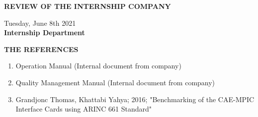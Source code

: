 \documentclass[a4paper,13pt]{report}
\begin{document}
    \newpage
    \centerline{\huge{\textbf{REVIEW OF THE INTERNSHIP COMPANY}}}
    \vspace{10mm}
    \noindent\makebox[\linewidth]{\rule{\paperwidth}{0.4pt}}
    \noindent\makebox[\linewidth]{\rule{\paperwidth}{0.4pt}}
    \noindent\makebox[\linewidth]{\rule{\paperwidth}{0.4pt}}
    \noindent\makebox[\linewidth]{\rule{\paperwidth}{0.4pt}}
    \noindent\makebox[\linewidth]{\rule{\paperwidth}{0.4pt}}
    \noindent\makebox[\linewidth]{\rule{\paperwidth}{0.4pt}}
    \noindent\makebox[\linewidth]{\rule{\paperwidth}{0.4pt}}
    \noindent\makebox[\linewidth]{\rule{\paperwidth}{0.4pt}}
    \noindent\makebox[\linewidth]{\rule{\paperwidth}{0.4pt}}
    \noindent\makebox[\linewidth]{\rule{\paperwidth}{0.4pt}}
    \noindent\makebox[\linewidth]{\rule{\paperwidth}{0.4pt}}
    \noindent\makebox[\linewidth]{\rule{\paperwidth}{0.4pt}}
    \noindent\makebox[\linewidth]{\rule{\paperwidth}{0.4pt}}
    \noindent\makebox[\linewidth]{\rule{\paperwidth}{0.4pt}}
    \noindent\makebox[\linewidth]{\rule{\paperwidth}{0.4pt}}
    \vspace{10mm}
    \begin{flushright}
        Tuesday, June 8th 2021 \\ 
        \vspace{5mm}
        \textbf{Internship Department}
    \end{flushright}

    \newpage
    \tableofcontents
    \listoffigures

    
    
    

    

    

    

    \newpage
    \thispagestyle{plain}
    \begin{center}
        \Huge{\textbf{THE REFERENCES}}
    \end{center}
    \vspace{3mm}
    \begin{enumerate}
        \item Operation Manual (Internal document from company)
        \item Quality Management Manual (Internal document from company)
        \item Grandjonc Thomas, Khattabi Yahya; 2016; "Benchmarking of the CAE-MPIC Interface Cards
        using ARINC 661 Standard" 
    \end{enumerate}
\end{document}
